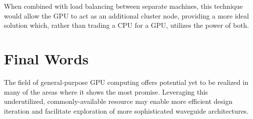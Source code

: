 When combined with load balancing between separate machines, this technique would allow the GPU to act as an additional cluster node, providing a more ideal solution which, rather than trading a CPU for a GPU, utilizes the power of both. 

\iffalse
\subsection{Machine Learning}
A high-speed simulator such as GoLightly may facilitate application of machine learning algorithms to accelerate FDTD even more. ML systems excel at identifying complex relationships and patterns. In theory, one could present simulation parameters such as waveguide architecture and composition and source wavelengths as a set of inputs into a multi-layer neural network, while simulation output is used to evaluate the fidelity of the network's predicted output. 

A trained network may be able to predict a simulation's output with a degree of accuracy sufficient to inform the design iteration process.  The ability to rapidly execute simulations should make generation of the large quantities of training data required by ML networks more feasible than traditional CPU-based systems. 
\fi

\section{Final Words}

The field of general-purpose GPU computing offers potential yet to be realized in many of the areas where it shows the most promise. Leveraging this underutilized, commonly-available resource may enable more efficient design iteration and facilitate exploration of more sophisticated waveguide architectures. 









